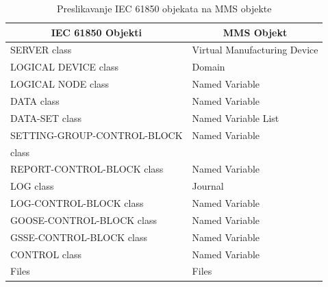 \documentclass[times, utf8, zavrsni]{fer}
\begin{document}
\begin{table}[tph]
    \centering
    \begin{tabular}{ |l|l| }
        \hline
        \multicolumn{1}{|c|}{\textbf{IEC 61850 Objekti}} &
        \multicolumn{1}{|c|}{\textbf{MMS Objekt}} \\
        \hline \hline
        SERVER class & Virtual Manufacturing Device \\
        \hline
        LOGICAL DEVICE class & Domain \\
        \hline
        LOGICAL NODE class & Named Variable \\
        \hline
        DATA class & Named Variable \\
        \hline
        DATA-SET class & Named Variable List \\
        \hline
        SETTING-GROUP-CONTROL-BLOCK & Named Variable \\
        class & \\
        \hline
        REPORT-CONTROL-BLOCK class  & Named Variable \\
        \hline
        LOG class & Journal \\
        \hline
        LOG-CONTROL-BLOCK class & Named Variable \\
        \hline
        GOOSE-CONTROL-BLOCK class & Named Variable \\
        \hline
        GSSE-CONTROL-BLOCK class & Named Variable \\
        \hline
        CONTROL class & Named Variable \\
        \hline
        Files & Files \\
        \hline
    \end{tabular}
    \caption{Preslikavanje IEC 61850 objekata na MMS objekte\footnotemark}
    \label{tab:iec-to-mms-objects}
\end{table}
\end{document}
